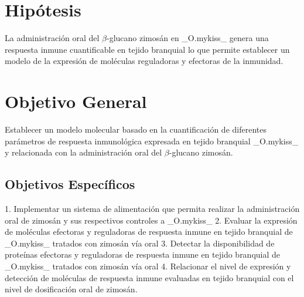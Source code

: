 \chapter{Hipótesis}

La administración oral del $\beta$-glucano zimosán en _O.mykiss_ genera una respuesta inmune cuantificable en tejido branquial lo que permite establecer un modelo de la expresión de moléculas reguladoras y efectoras de la inmunidad.

\chapter{Objetivo General}

Establecer un modelo molecular basado en la cuantificación de diferentes parámetros de respuesta inmunológica expresada en tejido branquial _O.mykiss_ y relacionada con la administración oral del $\beta$-glucano zimosán.

\section{Objetivos Específicos}

1. Implementar un sistema de alimentación que permita realizar la administración oral de zimosán y sus respectivos controles a _O.mykiss_
2. Evaluar la expresión de moléculas efectoras y reguladoras de respuesta inmune en tejido branquial de _O.mykiss_ tratados con zimosán vía oral
3. Detectar la disponibilidad de proteínas efectoras y reguladoras de respuesta inmune en tejido branquial de _O.mykiss_ tratados con zimosán vía oral
4. Relacionar el nivel de expresión y detección de moléculas de respuesta inmune evaluadas en tejido branquial con el nivel de dosificación oral de zimosán.

\clearpage

